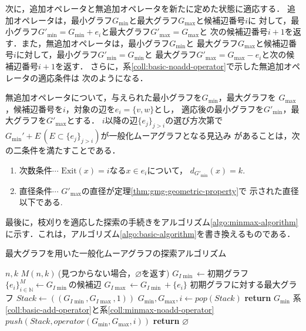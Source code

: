 次に，追加オペレータと無追加オペレータを新たに定めた状態に適応する．
追加オペレータは，最小グラフ$G_{\min}$と最大グラフ$G_{\max}$と候補辺番号$i$に
対して，最小グラフ$G'_{\min}=G_{\min}+e_i$と最大グラフ$G'_{\max}=G_{\max}$と
次の候補辺番号$i+1$を返す．また，無追加オペレータは，最小グラフ$G_{\min}$と
最大グラフ$G_{\max}$と候補辺番号$i$に対して，最小グラフ$G'_{\min}=G_{\min}$と
最大グラフ$G'_{\max}=G_{\max}-e_i$と次の候補辺番号$i+1$を返す．
さらに，系\ref{coll:basic-noadd-operator}で示した無追加オペレータの適応条件は
次のようになる．
\begin{corollary-without-proof}
  \label{coll:minmax-noadd-operator}
  無追加オペレータについて，与えられた最小グラフを$G_{\min}$，最大グラフを
  $G_{\max}$，候補辺番号を$i$，対象の辺を$e_i=\{v,w\}$とし，
  適応後の最小グラフを$G'_{\min}$，最大グラフを$G'_{\max}$とする．
  $i$以降の辺$\{e_j\}_{j>i}$の選び方次第で
  $G_{\min}'+E\,(E\subset \{e_j\}_{j>i})$が一般化ムーアグラフとなる見込み
  があることは，次の二条件を満たすことである．
  \begin{enumerate}
  \item 次数条件$\cdots$ $\text{Exit}(x)=i$なる$x\in e_i$について，
    $d_{G'_{\min}}(x)=k$.
  \item 直径条件$\cdots$ $G'_{\max}$の直径が定理\ref{thm:gmg-geometric-property}で
    示された直径以下である.
  \end{enumerate}
\end{corollary-without-proof}

最後に，枝刈りを適応した探索の手続きをアルゴリズム\ref{algo:minmax-algorithm}
に示す．これは，アルゴリズム\ref{algo:basic-algorithm}を書き換えるものである．
\begin{algorithm}[H]
  \caption{最大グラフを用いた一般化ムーアグラフの探索アルゴリズム}
  \label{algo:minmax-algorithm}
  \begin{algorithmic}[1]
    \Require $n,k$
    \Ensure $M(n,k)\:$(見つからない場合，$\varnothing$を返す)
    \State $G_{I\min}\gets\text{初期グラフ}$
    \State $\{e_i\}_{i\in\mathbb{N}}^M\gets G_{I\min}\text{の候補辺}$
    \State $G_{I\max}\gets G_{I\min}+\{e_i\}$
    \Comment 初期グラフに対する最大グラフ
    \State $Stack\gets((G_{I\min},G_{I\max},1))$
    \State $G_{\min},G_{\max},i\gets pop(Stack)$
    \State \textbf{return} $G_{\min}$
    \EndIf
    \Comment 系\ref{coll:basic-add-operator}と系\ref{coll:minmax-noadd-operator}
    \State $push(Stack,operator(G_{\min},G_{\max},i))$
    \EndIf
    \EndFor
    \EndWhile
    \State \textbf{return} $\varnothing$
    \EndProcedure
  \end{algorithmic}
\end{algorithm}

